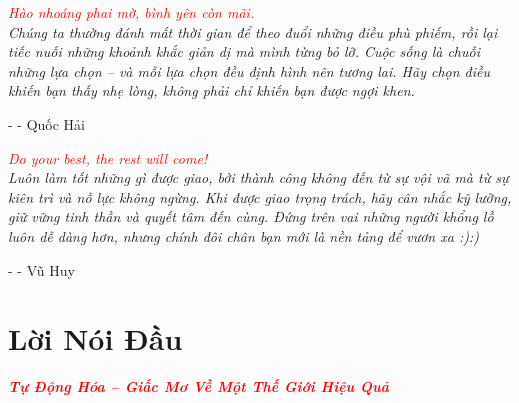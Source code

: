 \documentclass[a4paper,12pt,oneside]{book}
\begin{document}
\newpage

\noindent\vspace{5cm}

\begin{center}
    \textit{ \textcolor{red}{Hào nhoáng phai mờ, bình yên còn mãi.}\\
    Chúng ta thường đánh mất thời gian để theo đuổi những điều phù phiếm, rồi lại tiếc nuối những khoảnh khắc giản dị mà mình từng bỏ lỡ. Cuộc sống là chuỗi những lựa chọn – và mỗi lựa chọn đều định hình nên tương lai. Hãy chọn điều khiến bạn thấy nhẹ lòng, không phải chỉ khiến bạn được ngợi khen.}
    
    \vspace{0.5cm}
    \hspace{10cm}
    - - Quốc Hải 
\end{center}

\vspace{2cm}

\begin{center}
    \textit{\textcolor{red}{Do your best, the rest will come!}\\
    Luôn làm tốt những gì được giao, bởi thành công không đến từ sự vội vã mà từ sự kiên trì và nỗ lực không ngừng. Khi được giao trọng trách, hãy cân nhắc kỹ lưỡng, giữ vững tinh thần và quyết tâm đến cùng. Đứng trên vai những người khổng lồ luôn dễ dàng hơn, nhưng chính đôi chân bạn mới là nền tảng để vươn xa :):)}

    \vspace{0.5cm}
    \hspace{10cm}
    - - Vũ Huy
\end{center}

\newpage

\chapter*{Lời Nói Đầu}
\fontsize{13pt}{16pt}\selectfont
\begin{center}
    \textit{\textcolor{red}{\textbf{Tự Động Hóa – Giấc Mơ Về Một Thế Giới Hiệu Quả}}}
\end{center}
\end{document}
